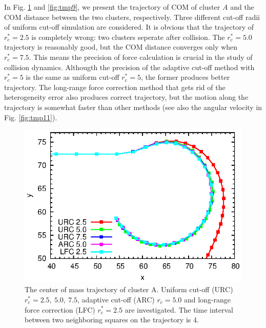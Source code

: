 \documentclass[aps,pre,preprint]{revtex4}
\begin{document}
In Fig. \ref{fig:tmp8} and \ref{fig:tmp9}, we present the trajectory
of COM of cluster $A$ and the COM distance between the two clusters,
respectively. Three different cut-off radii of uniform cut-off
simulation are considered. It is obvious that the trajectory of
$r_c^\ast = 2.5$ is completely wrong: two clusters seperate after
collision. The $r_c^\ast = 5.0$ trajectory is reasonably good, but the
COM distance converges only when $r_c^\ast = 7.5$. This means the
precision of force calculation is crucial in the study of collision
dynamics. Althougth the precision of the adaptive cut-off method with
$r_c^\ast = 5$ is the same as uniform cut-off $r_c^\ast = 5$, the former
produces better trajectory. The long-range force
correction method that gets rid of the heterogeneity error also produces
correct trajectory, but the motion along the trajectory is somewhat
faster than other methods (see also the angular velocity in
Fig. \ref{fig:tmp11}).

\begin{figure}
  \centering
  \includegraphics[]{fig/trajs.eps}
  \caption{The center of mass trajectory of cluster A. Uniform cut-off
    (URC) $r_c^\ast = 2.5,\ 5.0,\ 7.5$, adaptive cut-off (ARC) $r_c =
    5.0$ and long-range force correction (LFC) $r^\ast_c = 2.5$ are
    investigated.  The time interval between two neighboring squares
    on the trajectory is 4.  }
  \label{fig:tmp8}
\end{figure}
\end{document}

